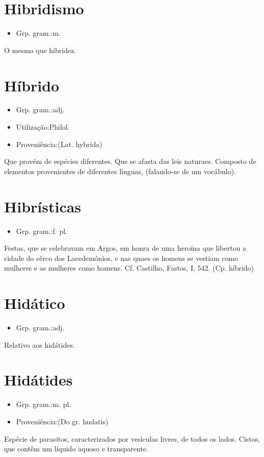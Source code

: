 \documentclass{article}
\begin{document}
\section{Hibridismo}
\begin{itemize}
\item {Grp. gram.:m.}
\end{itemize}
O mesmo que \textunderscore hibridez\textunderscore .
\section{Híbrido}
\begin{itemize}
\item {Grp. gram.:adj.}
\end{itemize}
\begin{itemize}
\item {Utilização:Philol.}
\end{itemize}
\begin{itemize}
\item {Proveniência:(Lat. \textunderscore hybrida\textunderscore )}
\end{itemize}
Que provém de espécies diferentes.
Que se afasta das leis naturaes.
Composto de elementos provenientes de diferentes línguas, (falando-se de um vocábulo).
\section{Hibrísticas}
\begin{itemize}
\item {Grp. gram.:f. pl.}
\end{itemize}
Festas, que se celebravam em Argos, em honra de uma heroína que libertou a cidade do cêrco dos Lacedemónios, e nas quaes os homens se vestiam como mulheres e as mulheres como homens. Cf. Castilho, \textunderscore Fastos\textunderscore , I, 542.
(Cp. \textunderscore híbrido\textunderscore )
\section{Hidático}
\begin{itemize}
\item {Grp. gram.:adj.}
\end{itemize}
Relativo aos hidátides.
\section{Hidátides}
\begin{itemize}
\item {Grp. gram.:m. pl.}
\end{itemize}
\begin{itemize}
\item {Proveniência:(Do gr. \textunderscore hudatis\textunderscore )}
\end{itemize}
Espécie de parasitos, caracterizados por vesículas livres, de todos os lados.
Cistos, que contêm um líquido aquoso e transparente.
\end{document}
